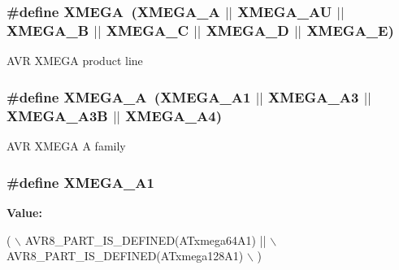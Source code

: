\subsubsection[{X\+M\+E\+G\+A}]{\setlength{\rightskip}{0pt plus 5cm}\#define X\+M\+E\+G\+A~({\bf X\+M\+E\+G\+A\+\_\+\+A} $\vert$$\vert$ {\bf X\+M\+E\+G\+A\+\_\+\+A\+U} $\vert$$\vert$ {\bf X\+M\+E\+G\+A\+\_\+\+B} $\vert$$\vert$ {\bf X\+M\+E\+G\+A\+\_\+\+C} $\vert$$\vert$ {\bf X\+M\+E\+G\+A\+\_\+\+D} $\vert$$\vert$ {\bf X\+M\+E\+G\+A\+\_\+\+E})}\label{group__xmega__part__macros__group_ga959bff90afbae437308a52eeb67b3368}
A\+V\+R X\+M\+E\+G\+A product line \hypertarget{group__xmega__part__macros__group_gab903a90d3a0bc99d7248eaecbb325a23}{}
\subsubsection[{X\+M\+E\+G\+A\+\_\+\+A}]{\setlength{\rightskip}{0pt plus 5cm}\#define X\+M\+E\+G\+A\+\_\+\+A~(X\+M\+E\+G\+A\+\_\+\+A1 $\vert$$\vert$ X\+M\+E\+G\+A\+\_\+\+A3 $\vert$$\vert$ X\+M\+E\+G\+A\+\_\+\+A3\+B $\vert$$\vert$ X\+M\+E\+G\+A\+\_\+\+A4)}\label{group__xmega__part__macros__group_gab903a90d3a0bc99d7248eaecbb325a23}
A\+V\+R X\+M\+E\+G\+A A family \hypertarget{group__xmega__part__macros__group_gaa0df665226b6faf69dcc137f1b78f074}{}
\subsubsection[{X\+M\+E\+G\+A\+\_\+\+A1}]{\setlength{\rightskip}{0pt plus 5cm}\#define X\+M\+E\+G\+A\+\_\+\+A1}\label{group__xmega__part__macros__group_gaa0df665226b6faf69dcc137f1b78f074}
{\bfseries Value\+:}
\begin{DoxyCode}
( \(\backslash\)
        AVR8\_PART\_IS\_DEFINED(ATxmega64A1)  || \(\backslash\)
        AVR8\_PART\_IS\_DEFINED(ATxmega128A1) \(\backslash\)
        )
\end{DoxyCode}
\hypertarget{group__xmega__part__macros__group_ga6672329ddee03af905aa378946568b67}{}
